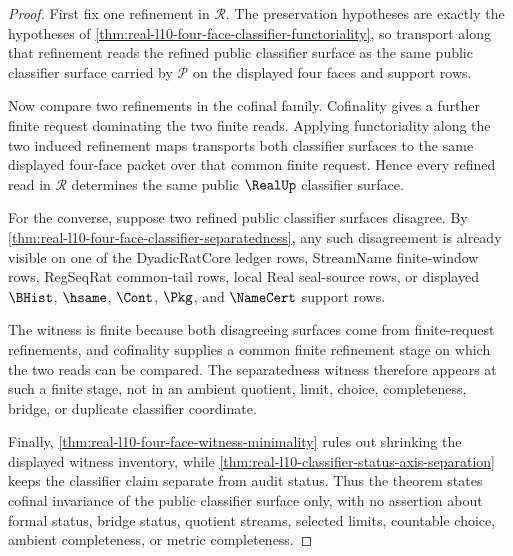 \begin{proof}
First fix one refinement in $\mathcal R$. The preservation hypotheses are exactly the hypotheses of \autoref{thm:real-l10-four-face-classifier-functoriality}, so transport along that refinement reads the refined public classifier surface as the same public classifier surface carried by $\mathcal P$ on the displayed four faces and support rows.

Now compare two refinements in the cofinal family. Cofinality gives a further finite request dominating the two finite reads. Applying functoriality along the two induced refinement maps transports both classifier surfaces to the same displayed four-face packet over that common finite request. Hence every refined read in $\mathcal R$ determines the same public $\RealUp$ classifier surface.

For the converse, suppose two refined public classifier surfaces disagree. By \autoref{thm:real-l10-four-face-classifier-separatedness}, any such disagreement is already visible on one of the DyadicRatCore ledger rows, StreamName finite-window rows, RegSeqRat common-tail rows, local Real seal-source rows, or displayed $\BHist$, $\hsame$, $\Cont$, $\Pkg$, and $\NameCert$ support rows.

The witness is finite because both disagreeing surfaces come from finite-request refinements, and cofinality supplies a common finite refinement stage on which the two reads can be compared. The separatedness witness therefore appears at such a finite stage, not in an ambient quotient, limit, choice, completeness, bridge, or duplicate classifier coordinate.

Finally, \autoref{thm:real-l10-four-face-witness-minimality} rules out shrinking the displayed witness inventory, while \autoref{thm:real-l10-classifier-status-axis-separation} keeps the classifier claim separate from audit status. Thus the theorem states cofinal invariance of the public classifier surface only, with no assertion about formal status, bridge status, quotient streams, selected limits, countable choice, ambient completeness, or metric completeness.
\end{proof}

